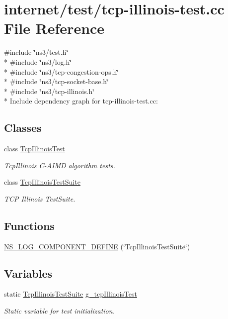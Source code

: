 \hypertarget{tcp-illinois-test_8cc}{}\section{internet/test/tcp-\/illinois-\/test.cc File Reference}
\label{tcp-illinois-test_8cc}
{\ttfamily \#include \char`\"{}ns3/test.\+h\char`\"{}}\\*
{\ttfamily \#include \char`\"{}ns3/log.\+h\char`\"{}}\\*
{\ttfamily \#include \char`\"{}ns3/tcp-\/congestion-\/ops.\+h\char`\"{}}\\*
{\ttfamily \#include \char`\"{}ns3/tcp-\/socket-\/base.\+h\char`\"{}}\\*
{\ttfamily \#include \char`\"{}ns3/tcp-\/illinois.\+h\char`\"{}}\\*
Include dependency graph for tcp-\/illinois-\/test.cc\+:
\subsection*{Classes}
\begin{DoxyCompactItemize}
\item 
class \hyperlink{classTcpIllinoisTest}{Tcp\+Illinois\+Test}
\begin{DoxyCompactList}\small\item\em Tcp\+Illinois C-\/\+A\+I\+MD algorithm tests. \end{DoxyCompactList}\item 
class \hyperlink{classTcpIllinoisTestSuite}{Tcp\+Illinois\+Test\+Suite}
\begin{DoxyCompactList}\small\item\em T\+CP Illinois Test\+Suite. \end{DoxyCompactList}\end{DoxyCompactItemize}
\subsection*{Functions}
\begin{DoxyCompactItemize}
\item 
\hyperlink{tcp-illinois-test_8cc_a4f27774415514ee1164f34a77d3ef932}{N\+S\+\_\+\+L\+O\+G\+\_\+\+C\+O\+M\+P\+O\+N\+E\+N\+T\+\_\+\+D\+E\+F\+I\+NE} (\char`\"{}Tcp\+Illinois\+Test\+Suite\char`\"{})
\end{DoxyCompactItemize}
\subsection*{Variables}
\begin{DoxyCompactItemize}
\item 
static \hyperlink{classTcpIllinoisTestSuite}{Tcp\+Illinois\+Test\+Suite} \hyperlink{tcp-illinois-test_8cc_a510c4531365bd766fe4e4402b90ed791}{g\+\_\+tcp\+Illinois\+Test}
\begin{DoxyCompactList}\small\item\em Static variable for test initialization. \end{DoxyCompactList}\end{DoxyCompactItemize}


